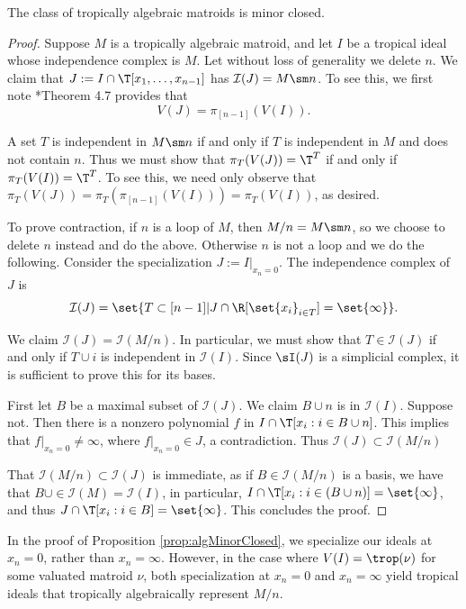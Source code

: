\begin{proposition}\label{prop:algMinorClosed}
The class of tropically algebraic matroids is minor closed.
\end{proposition}
\begin{proof}
Suppose $M$ is a tropically algebraic matroid, and let $I$ be a tropical ideal whose independence complex is $M$. Let without loss of generality we delete $n$. We claim that $J:=I\cap \T[x_1,\dots,x_{n-1}]$ has $\mathcal I(J) = M\sm n$. To see this, we first note \cite{MR20}*{Theorem 4.7} provides that
$$V(J)= \pi_{[n-1]}(V(I)).$$

A set $T$ is independent in $M\sm n$ if and only if $T$ is independent in $M$ and does not contain $n$. Thus we must show that $\pi_T(V(J))=\T^T$ if and only if $\pi_T(V(I))=\T^T$. To see this, we need only observe that $\pi_T(V(J))=\pi_T(\pi_{[n-1]}(V(I)))=\pi_T(V(I))$, as desired.

To prove contraction, if $n$ is a loop of $M$, then $M/n =M\sm n$, so we choose to delete $n$ instead and do the above. Otherwise $n$ is not a loop and we do the following. Consider the specialization $J:= I|_{x_n=0}$. The independence complex of $J$ is 
$$\mathcal I(J) = \set{T\subset [n-1] | J \cap \R[\set{x_i}_{i\in T}] = \set{\infty}}.$$

We claim $\mathcal I(J) = \mathcal I(M/n)$. In particular, we must show that $T\in \mathcal I(J)$ if and only if $T\cup i$ is independent in $\mathcal I(I)$. Since $\sI(J)$ is a simplicial complex, it is sufficient to prove this for its bases.


First let $B$ be a maximal subset of $\mathcal I(J)$. We claim $B\cup n$ is in $\mathcal I(I)$. Suppose not. Then there is a nonzero polynomial $f$ in $I\cap \T[x_i: i \in B\cup n]$. This implies that $f|_{x_n=0}\neq \infty$, where $f|_{x_n=0}\in J$, a contradiction. Thus $\mathcal I(J)\subset \mathcal I(M/n)$

That $\mathcal I(M/n)\subset \mathcal I(J)$ is immediate, as if $B\in \mathcal I(M/n)$ is a basis, we have that $B\cup \in \mathcal I(M)=\mathcal I(I)$, in particular, $I\cap \T[x_i: i\in (B\cup n)]=\set{\infty}$, and thus $J\cap \T[x_i: i\in B]=\set{\infty}$. This concludes the proof.
\end{proof}

In the proof of Proposition \ref{prop:algMinorClosed}, we specialize our ideals at $x_n=0$, rather than $x_n=\infty$. However, in the case where $V(I)=\trop(\nu)$ for some valuated matroid $\nu$, both specialization at $x_n=0$ and $x_n=\infty$ yield tropical ideals that tropically algebraically represent $M/n$.


